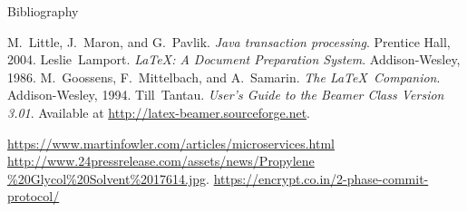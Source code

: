 \documentclass{beamer}
\begin{document}
\begin{frame}[label=bibliography]{Bibliography}
    \begin{thebibliography}{9}
        M.~Little, J.~Maron, and G.~Pavlik.
        \emph{Java transaction processing}.
        Prentice Hall, 2004.
        Leslie~Lamport.
        \emph{\LaTeX : A Document Preparation System}.
        Addison-Wesley, 1986.
        M.~Goossens, F.~Mittelbach, and A.~Samarin.
        \emph{The \LaTeX\ Companion}.
        Addison-Wesley, 1994.
        Till~Tantau.
        \emph{User's Guide to the Beamer Class Version 3.01}.
        Available at \url{http://latex-beamer.sourceforge.net}.

        \small
        \href{https://www.martinfowler.com/articles/microservices.html}{https://www.martinfowler.com/articles/microservices.html}
        \href{http://www.24pressrelease.com/assets/news/Propylene\%20Glycol\%20Solvent\%2017614.jpg}{http://www.24pressrelease.com/assets/news/Propylene\\\%20Glycol\%20Solvent\%2017614.jpg}.
        \href{https://encrypt.co.in/2-phase-commit-protocol/}{https://encrypt.co.in/2-phase-commit-protocol/}
    \end{thebibliography}


\end{frame}
\end{document}
